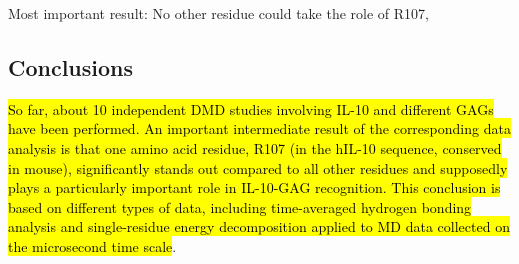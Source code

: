 Most important result: No other residue could take the role of R107,

\subsection{Conclusions}

\hl{So far, about 10 independent DMD studies involving IL-10 and different GAGs
have been performed. An important intermediate result of the corresponding data
analysis is that one amino acid residue, R107 (in the hIL-10 sequence, conserved
in mouse), significantly stands out compared to all other residues and
supposedly plays a particularly important role in IL-10-GAG recognition. This
conclusion is based on different types of data, including time-averaged hydrogen
bonding analysis and single-residue energy decomposition applied to MD data
collected on the microsecond time scale}.


